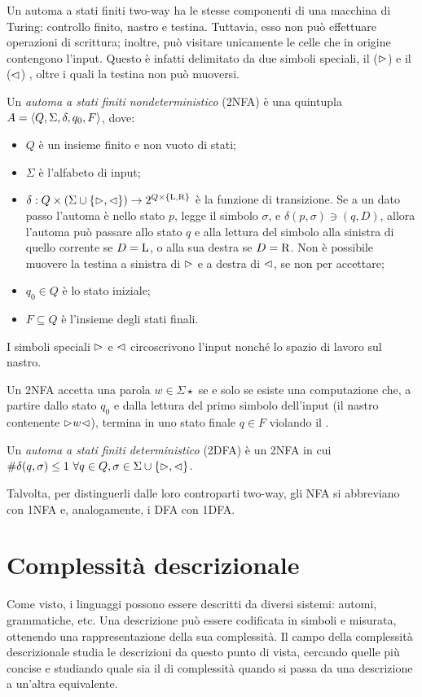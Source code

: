 Un automa a stati finiti two-way ha le stesse componenti di una macchina di Turing: controllo finito, nastro e testina. Tuttavia, esso non può effettuare operazioni di scrittura; inoltre, può visitare unicamente le celle che in origine contengono l'input. Questo è infatti delimitato da due simboli speciali, il  ($\rhd$) e il  ($\lhd$) , oltre i quali la testina non può muoversi.
\begin{defin}
	Un \emph{automa a stati finiti  nondeterministico} (2NFA) è una quintupla $A=\langle Q,\Sigma,\delta,q_0,F \rangle$, dove:
	\begin{itemize}
		\item $Q$ è un insieme finito e non vuoto di stati;
		\item $\Sigma$ è l'alfabeto di input;
		\item $\delta:Q\times(\Sigma\cup\left\{ \rhd,\lhd \right\})\to2^{Q\times\left\{ \mathrm L,\mathrm R \right\}}$ è la funzione di transizione. Se a un dato passo l'automa è nello stato $p$, legge il simbolo $\sigma$, e $\delta(p,\sigma)\ni (q,D)$, allora l'automa può passare allo stato $q$ e alla lettura del simbolo alla sinistra di quello corrente se $D=\mathrm L$, o alla sua destra se $D=\mathrm R$. Non è possibile muovere la testina a sinistra di $\rhd$ e a destra di $\lhd$, se non per accettare;
		\item $q_0\in Q$ è lo stato iniziale;
		\item $F\subseteq Q$ è l'insieme degli stati finali.
	\end{itemize}
	I simboli speciali $\rhd$ e $\lhd$ circoscrivono l'input nonché lo spazio di lavoro sul nastro.

	Un 2NFA accetta una parola $w\in\Sigma\star$ se e solo se esiste una computazione che, a partire dallo stato $q_0$ e dalla lettura del primo simbolo dell'input (il nastro contenente $\rhd w\lhd$), termina in uno stato finale $q\in F$ violando il .
\end{defin}

\begin{defin}
	Un \emph{automa a stati finiti  deterministico} (2DFA) è un 2NFA in cui $\# \delta(q,\sigma)\leq 1 ~ \forall q\in Q,\sigma\in\Sigma\cup\left\{ \rhd,\lhd \right\}$.
\end{defin}

Talvolta, per distinguerli dalle loro controparti two-way, gli NFA  si abbreviano con 1NFA e, analogamente, i DFA con 1DFA.


\section{Complessità descrizionale}
Come visto, i linguaggi possono essere descritti da diversi sistemi: automi, grammatiche, etc. Una descrizione può essere codificata in simboli e misurata, ottenendo una rappresentazione della sua complessità. Il campo della complessità descrizionale studia le descrizioni da questo punto di vista, cercando quelle più concise e studiando quale sia il  di complessità quando si passa da una descrizione a un'altra equivalente.

